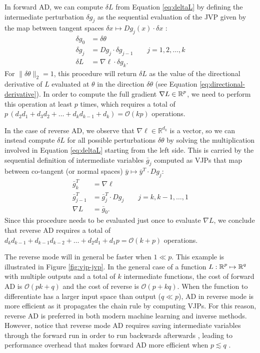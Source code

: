 In forward AD, we can compute $\delta L$ from Equation \eqref{eq:deltaL} by defining the intermediate perturbation $\delta g_j$ as the sequential evaluation of the JVP given by the map between tangent spaces $\delta x \mapsto Dg_j (x) \cdot \delta x$ \cite{Griewank:2008kh}:
\begin{align}
    \delta g_0 &= \delta \theta \\
    \delta g_j &= D g_j \cdot \delta g_{j-1} \qquad j = 1, 2, \ldots, k \\
    \delta L &= \nabla \ell \cdot \delta g_{k}.
\end{align}
For $\| \delta \theta \|_2 = 1$, this procedure will return $\delta L$ as the value of the directional derivative of $L$ evaluated at $\theta$ in the direction $\delta \theta$ (see Equation \eqref{eq:directional-derivative}). 
In order to compute the full gradient $\nabla L \in \operatorname{\mathbb{R}}^p$, we need to perform this operation at least $p$ times, which requires a total of $p \, (d_2 d_1 + d_3 d_2 + \ldots + d_k d_{k-1} + d_k )= \mathcal O (kp)$ operations.

In the case of reverse AD, we observe that $\nabla \ell \in \mathbb R^{d_k}$ is a vector, so we can instead compute $\delta L$ for all possible perturbations $\delta \theta$ by solving the multiplication involved in Equation \eqref{eq:deltaL} starting from the left side. 
This is carried by the sequential definition of intermediate variables $\bar g_j$ computed as VJPs that map between co-tangent (or normal spaces) $\bar y \mapsto \bar y^T \cdot Dg_j$:
\begin{align}
    \bar g_{k}^T &= \nabla \ell \\
    \bar g_{j-1}^T &= \bar g_{j}^T \cdot Dg_j \qquad j = k, k-1, \ldots, 1 \\
    \nabla L &= \bar g_0.
\end{align}
Since this procedure needs to be evaluated just once to evaluate $\nabla L$, we conclude that reverse AD requires a total of $ d_k d_{k-1} + d_{k-1} d_{k-2} + \ldots + d_2 d_1 + d_1 p = \mathcal O (k+p)$ operations. 

The reverse mode will in general be faster when $1 \ll p$. 
This example is illustrated in Figure \ref{fig:vjp-jvp}. 
In the general case of a function $L : \operatorname{\mathbb{R}}^p \mapsto \operatorname{\mathbb{R}}^q$ with multiple outputs and a total of $k$ intermediate functions, the cost of forward AD is $\mathcal O (pk + q)$ and the cost of reverse is $\mathcal O (p + kq)$.
When the function to differentiate has a larger input space than output ($q \ll p$), AD in reverse mode is more efficient as it propagates the chain rule by computing VJPs.
For this reason, reverse AD is preferred in both modern machine learning and inverse methods.
However, notice that reverse mode AD requires saving intermediate variables through the forward run in order to run backwards afterwards \cite{Bennett_1973}, leading to performance overhead that makes forward AD more efficient when $p \lesssim q$ \cite{Griewank_1989, Margossian_2018, Baydin_Pearlmutter_Radul_Siskind_2015}. 


